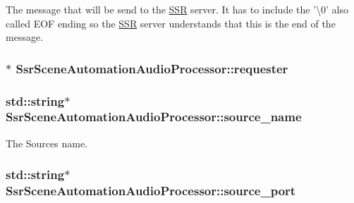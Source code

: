 The message that will be send to the \hyperlink{namespaceSSR}{S\-S\-R} server. It has to include the '\textbackslash{}0' also called E\-O\-F ending so the \hyperlink{namespaceSSR}{S\-S\-R} server understands that this is the end of the message. \hypertarget{classSsrSceneAutomationAudioProcessor_a7afa611e32e349dbc508592c607725a9}{
\subsubsection[{requester}]{$\ast$ Ssr\-Scene\-Automation\-Audio\-Processor\-::requester\hspace{0.3cm}{\ttfamily [private]}}}\label{classSsrSceneAutomationAudioProcessor_a7afa611e32e349dbc508592c607725a9}
\hypertarget{classSsrSceneAutomationAudioProcessor_a6224b4d4a4617b35dc1e2861cb8057cb}{
\subsubsection[{source\-\_\-name}]{\setlength{\rightskip}{0pt plus 5cm}std\-::string$\ast$ Ssr\-Scene\-Automation\-Audio\-Processor\-::source\-\_\-name\hspace{0.3cm}{\ttfamily [private]}}}\label{classSsrSceneAutomationAudioProcessor_a6224b4d4a4617b35dc1e2861cb8057cb}
The Sources name. \hypertarget{classSsrSceneAutomationAudioProcessor_aa81d7065ff2247c0df43bf80f4db5198}{
\subsubsection[{source\-\_\-port}]{\setlength{\rightskip}{0pt plus 5cm}std\-::string$\ast$ Ssr\-Scene\-Automation\-Audio\-Processor\-::source\-\_\-port\hspace{0.3cm}{\ttfamily [private]}}}\label{classSsrSceneAutomationAudioProcessor_aa81d7065ff2247c0df43bf80f4db5198}
